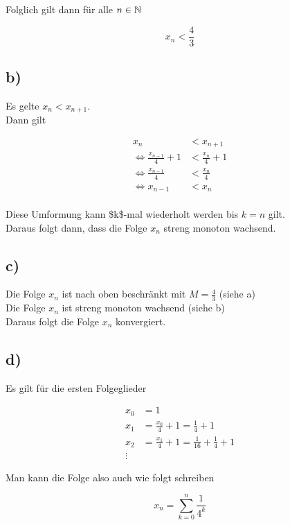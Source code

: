 \documentclass[a4paper, 11pt]{article}
\begin{document}
Folglich gilt dann für alle \(n \in \mathbb{N}\)

$$ x_n < \frac{4}{3} $$

\subsection{b)}
\label{sec:org1c47c2f}
Es gelte \(x_n < x_{n+1}\). \\
Dann gilt

\begin{align*}
    x_n &< x_{n+1} \\
    \Leftrightarrow \frac{x_{n-1}}{4} + 1 &< \frac{x_n}{4} + 1 \\
    \Leftrightarrow \frac{x_{n-1}}{4} &< \frac{x_n}{4} \\
    \Leftrightarrow x_{n-1} &< x_n \\
\end{align*}

Diese Umformung kann \$k\$-mal wiederholt werden bis \(k = n\) gilt. \\
Daraus folgt dann, dass die Folge \(x_n\) streng monoton wachsend.

\subsection{c)}
\label{sec:org79a4571}
Die Folge \(x_n\) ist nach oben beschränkt mit \(M = \frac{4}{3}\) (siehe a) \\

Die Folge \(x_n\) ist streng monoton wachsend (siehe b) \\

Daraus folgt die Folge \(x_n\) konvergiert.

\subsection{d)}
\label{sec:org4cadb5b}
Es gilt für die ersten Folgeglieder

\begin{align*}
    x_0 &= 1 \\
    x_1 &= \frac{x_0}{4} + 1 = \frac{1}{4} + 1 \\
    x_2 &= \frac{x_1}{4} + 1 = \frac{1}{16} + \frac{1}{4} + 1 \\
    \vdots
\end{align*}

Man kann die Folge also auch wie folgt schreiben

$$ x_n = \sum_{k = 0}^{n} \frac{1}{4^k} $$
\end{document}
